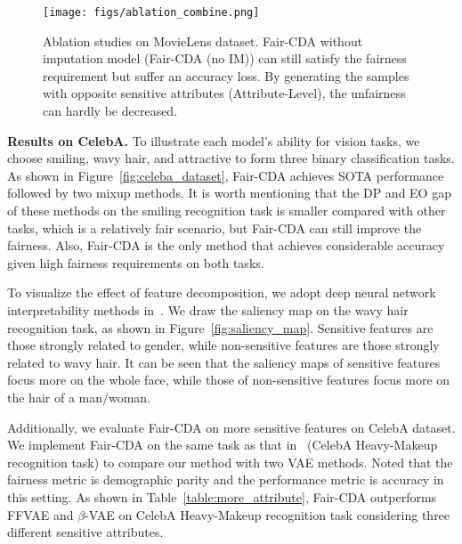 \documentclass[letterpaper]{article} %
\begin{document}
\begin{figure}[t]
	\centering
\texttt{[image: figs/ablation\_combine.png]}
	\caption{Ablation studies on MovieLens dataset. 
	Fair-CDA without imputation model (Fair-CDA (no IM)) can still satisfy the fairness requirement but suffer an accuracy loss. By generating the samples with opposite sensitive attributes (Attribute-Level), the unfairness can hardly be decreased.
	}
\label{fig:ablation_movielens_dataset}
\end{figure}

\noindent\textbf{Results on CelebA.} To illustrate each model’s ability for vision tasks, we choose smiling, wavy hair, and attractive to form three binary classification tasks. As shown in Figure~\ref{fig:celeba_dataset}, Fair-CDA achieves SOTA performance followed by two mixup methods. It is worth mentioning that the DP and EO gap of these methods on the smiling recognition task is smaller compared with other tasks, which is a relatively fair scenario, but Fair-CDA can still improve the fairness. 
Also, Fair-CDA is the only method that achieves considerable accuracy given high fairness requirements on both tasks. 

To visualize the effect of feature decomposition, we adopt deep neural network
interpretability methods in~\cite{adebayo2018sanity}.
We draw the saliency map on the wavy hair recognition task, as shown in Figure~\ref{fig:saliency_map}. Sensitive features are those strongly related to gender, while non-sensitive features are those strongly related to wavy hair. It can be seen that the saliency maps of sensitive features focus more on the whole face, while those of non-sensitive features focus more on the hair of a man/woman. 

Additionally, we evaluate Fair-CDA on more sensitive features on CelebA dataset. We implement Fair-CDA on the same task as that in~\cite{creager2019flexibly} (CelebA Heavy-Makeup recognition task) to compare our method with two VAE methods. Noted that the fairness metric is demographic parity and the performance metric is accuracy in this setting. As shown in Table~\ref{table:more_attribute}, Fair-CDA outperforms FFVAE and $\beta$-VAE on CelebA Heavy-Makeup recognition task considering three different sensitive attributes.
\end{document}
